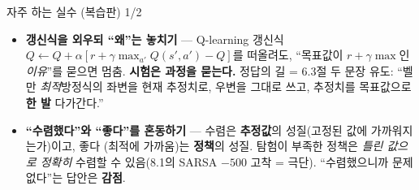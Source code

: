 \begin{frame}{자주 하는 실수 (복습판) 1/2}
  \begin{itemize}
    \item \textbf{갱신식을 외우되 ``왜''는 놓치기} --- Q-learning 갱신식
      $Q\leftarrow Q+\alpha[r+\gamma\max_{a'}Q(s',a')-Q]$를 떠올려도,
      ``목표값이 $r+\gamma\max$인 \emph{이유}''를 묻으면 멈춤.
      \textbf{시험은 과정을 묻는다.} 정답의 길 = 6.3절 두 문장 유도:
      ``벨만 \emph{최적}방정식의 좌변을 현재 추정치로, 우변을 그대로
      쓰고, 추정치를 목표값으로 \textbf{한 발} 다가간다.''
    \item \textbf{``수렴했다''와 ``좋다''를 혼동하기} --- 수렴은
      \textbf{추정값}의 성질(고정된 값에 가까워지는가)이고, 좋다
      (최적에 가까움)는 \textbf{정책}의 성질. 탐험이 부족한 정책은
      \emph{틀린 값으로 정확히} 수렴할 수 있음(8.1의 SARSA $-500$
      고착 = 극단). ``수렴했으니까 문제 없다''는 답안은 \textbf{감점}.
  \end{itemize}
\end{frame}
